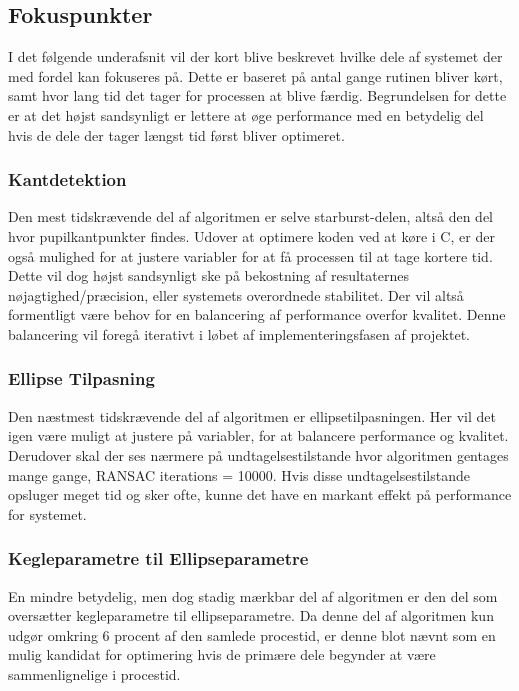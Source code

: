 \documentclass[rapport.tex]{subfiles}
\begin{document}
	\subsection{Fokuspunkter}
	I det følgende underafsnit vil der kort blive beskrevet hvilke dele af systemet der med fordel kan fokuseres på. Dette er baseret på antal gange rutinen bliver kørt, samt hvor lang tid det tager for processen at blive færdig. Begrundelsen for dette er at det højst sandsynligt er lettere at øge performance med en betydelig del hvis de dele der tager længst tid først bliver optimeret.
	
	\subsubsection{Kantdetektion}
	Den mest tidskrævende del af algoritmen er selve starburst-delen, altså den del hvor pupilkantpunkter findes. Udover at optimere koden ved at køre i C, er der også mulighed for at justere variabler for at få processen til at tage kortere tid. Dette vil dog højst sandsynligt ske på bekostning af resultaternes nøjagtighed/præcision, eller systemets overordnede stabilitet. Der vil altså formentligt være behov for en balancering af performance overfor kvalitet. Denne balancering vil foregå iterativt i løbet af implementeringsfasen af projektet.
	
	\subsubsection{Ellipse Tilpasning}
	Den næstmest tidskrævende del af algoritmen er ellipsetilpasningen. Her vil det igen være muligt at justere på variabler, for at balancere performance og kvalitet. Derudover skal der ses nærmere på undtagelsestilstande hvor algoritmen gentages mange gange, RANSAC iterations = 10000. Hvis disse undtagelsestilstande opsluger meget tid og sker ofte, kunne det have en markant effekt på performance for systemet.
	
	\subsubsection{Kegleparametre til Ellipseparametre}
	En mindre betydelig, men dog stadig mærkbar del af algoritmen er den del som oversætter kegleparametre til ellipseparametre. Da denne del af algoritmen kun udgør omkring 6 procent af den samlede procestid, er denne blot nævnt som en mulig kandidat for optimering hvis de primære dele begynder at være sammenlignelige i procestid. 
	
\end{document}
